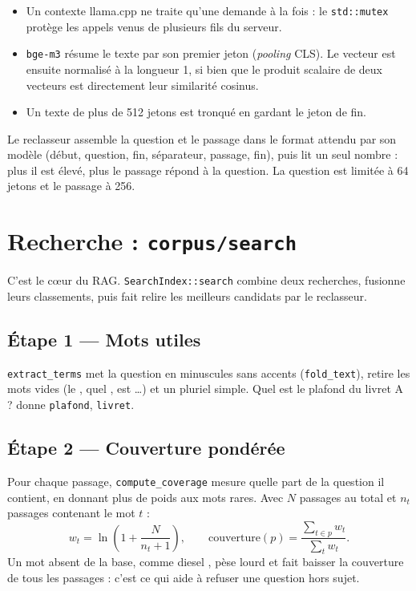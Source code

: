 \documentclass[11pt,a4paper]{article}
\begin{document}
\begin{itemize}
  \item Un contexte llama.cpp ne traite qu'une demande à la fois : le \texttt{std::mutex} protège les appels venus de plusieurs fils du serveur.
  \item \texttt{bge-m3} résume le texte par son premier jeton (\emph{pooling} CLS). Le vecteur est ensuite normalisé à la longueur 1, si bien que le produit scalaire de deux vecteurs est directement leur similarité cosinus.
  \item Un texte de plus de 512 jetons est tronqué en gardant le jeton de fin.
\end{itemize}

Le reclasseur assemble la question et le passage dans le format attendu par son modèle (début, question, fin, séparateur, passage, fin), puis lit un seul nombre : plus il est élevé, plus le passage répond à la question. La question est limitée à 64 jetons et le passage à 256.


\section{Recherche : \texttt{corpus/search}}
\label{sec:search}

C'est le cœur du RAG. \texttt{SearchIndex::search} combine deux recherches, fusionne leurs classements, puis fait relire les meilleurs candidats par le reclasseur.

\subsection{Étape 1 --- Mots utiles}

\texttt{extract\_terms} met la question en minuscules sans accents (\texttt{fold\_text}), retire les mots vides (\og le \fg, \og quel \fg, \og est \fg\dots) et un pluriel simple. \og Quel est le plafond du livret A ? \fg{} donne \texttt{plafond}, \texttt{livret}.

\subsection{Étape 2 --- Couverture pondérée}

Pour chaque passage, \texttt{compute\_coverage} mesure quelle part de la question il contient, en donnant plus de poids aux mots rares. Avec \(N\) passages au total et \(n_t\) passages contenant le mot \(t\) :
\[
w_t = \ln\!\left(1 + \frac{N}{n_t + 1}\right), \qquad
\text{couverture}(p) = \frac{\sum_{t \in p} w_t}{\sum_{t} w_t}.
\]
Un mot absent de la base, comme \og diesel \fg, pèse lourd et fait baisser la couverture de tous les passages : c'est ce qui aide à refuser une question hors sujet.
\end{document}
